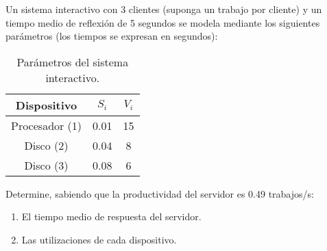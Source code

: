\begin{ejercicio}\label{ej:5.25}
    Un sistema interactivo con 3 clientes (suponga un trabajo por cliente) y un tiempo medio de reflexión de 5 segundos se modela mediante los siguientes parámetros (los tiempos se expresan en segundos):
    \begin{table}[h]
        \centering
        \begin{tabular}{|c|c|c|}
            \hline
            Dispositivo & $S_i$ & $V_i$ \\
            \hline
            Procesador (1) & 0.01 & 15 \\
            Disco (2) & 0.04 & 8 \\
            Disco (3) & 0.08 & 6 \\
            \hline
        \end{tabular}
        \caption{Parámetros del sistema interactivo.}
        \label{tab:5.25}
    \end{table}
    Determine, sabiendo que la productividad del servidor es 0.49 trabajos/s:
    \begin{enumerate}
        \item El tiempo medio de respuesta del servidor.
        \item Las utilizaciones de cada dispositivo.
    \end{enumerate}
\end{ejercicio}
\begin{comment}
\solucion
    \begin{enumerate}
        \item $R_0 = 1.1$ s.
        \item $U_1 = 0.07$, $U_2 = 0.16$, $U_3 = 0.24$.
    \end{enumerate}
\end{comment}

